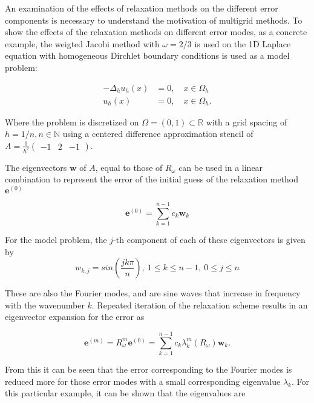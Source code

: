 An examination of the effects of relaxation methods on the different error components is necessary to understand the motivation of multigrid methods. 
To show the effects of the relaxation methods on different error modes, as a concrete example, the weigted Jacobi method with $\omega = 2/3$ is used on the 1D Laplace equation with homogeneous Dirchlet boundary conditions is used as a model problem:

\begin{equation}
\begin{aligned}
	-\Delta_h u_h(x) &= 0, \quad x \in \Omega_h \\
	u_h(x) &= 0, \quad x \in \Omega_h.
\end{aligned}
\label{eq:model_problem}
\end{equation}

Where the problem is discretized on $\Omega = (0, 1) \subset \mathbb{R}$ with a grid spacing of $h = 1/n, n \in \mathbb{N}$ using a centered difference approximation stencil of $A = \frac{1}{h^2} \begin{pmatrix} -1 & 2 &-1 \end{pmatrix}$.

The eigenvectors $\mathbf{w}$ of $A$, equal to those of $R_{\omega}$ can be used in a linear combination to represent the error of the initial guess of the relaxation method $\mathbf{e}^{(0)}$

\begin{equation}
	\mathbf{e}^{(0)} = \sum_{k=1}^{n-1}{c_{k}\mathbf{w}_{k}}
\end{equation}

For the model problem, the $j$-th component of each of these eigenvectors is given by 
\begin{equation}
	w_{k,j} = sin\left(\frac{jk\pi}{n}\right),\ 1 \leq k \leq n-1,\ 0 \leq j \leq n
\end{equation}

These are also the Fourier modes, and are sine waves that increase in frequency with the wavenumber $k$. Repeated iteration of the relaxation scheme results in an eigenvector expansion for the error as

\begin{equation}
	\mathbf{e}^{(m)} = R_{\omega}^m \mathbf{e}^{(0)} = \sum_{k=1}^{n-1}{c_k\lambda_k^m\left( R_{\omega}\right)\mathbf{w}_k}.
\end{equation}

From this it can be seen that the error corresponding to the Fourier modes is reduced more for those error modes with a small corresponding eigenvalue $\lambda_k$. For this particular example, it can be shown that the eigenvalues are

